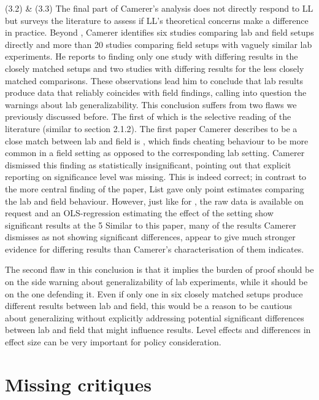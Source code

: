 \documentclass{article}
\begin{document}
(3.2) \& (3.3) The final part of Camerer’s analysis does not directly respond to LL but surveys the literature to assess if LL’s theoretical concerns make a difference in practice. Beyond  \citep{List.2006}, Camerer identifies six studies comparing lab and field setups directly and more than 20 studies comparing field setups with vaguely similar lab experiments. He reports to finding only one study with differing results in the closely matched setups and two studies with differing results for the less closely matched comparisons. These observations lead him to conclude that lab results produce data that reliably coincides with field findings, calling into question the warnings about lab generalizability. 
This conclusion suffers from two flaws we previously discussed before. The first of which is the selective reading of the literature (similar to section 2.1.2). 
The first paper Camerer describes to be a close match between lab and field is \citep{list2009}, which finds cheating behaviour to be more common in a field setting as opposed to the corresponding lab setting. Camerer dismissed this finding as statistically insignificant, pointing out that explicit reporting on significance level was missing. This is indeed correct; in contrast to the more central finding of the paper, List gave only point estimates comparing the lab and field behaviour. However, just like for \citep{List.2006}, the raw data is available on request and an OLS-regression estimating the effect of the setting show significant results at the 5%
Similar to this paper, many of the results Camerer dismisses as not showing significant differences, appear to give much stronger evidence for differing results than Camerer’s characterisation of them indicates. 

The second flaw in this conclusion is that it implies the burden of proof should be on the side warning about generalizability of lab experiments, while it should be on the one defending it. Even if only one in six closely matched setups produce different results between lab and field, this would be a reason to be cautious about generalizing without explicitly addressing potential significant differences between lab and field that might influence results. 
Level effects and differences in effect size can be very important for policy consideration.

\section*{Missing critiques}
\end{document}
